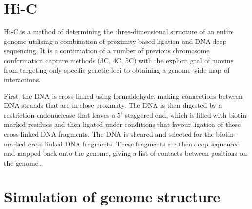 \documentclass[a4paper,11pt,oneside,final,english,toc=bib]{scrbook}
\begin{document}

\section{Hi-C} %
\label{sec:hi_c}

Hi-C is a method of determining the three-dimensional structure of an entire genome utilising a combination of proximity-based ligation and DNA deep sequencing. It is a continuation of a number of previous chromosome conformation capture methods (3C, 4C, 5C) with the explicit goal of moving from targeting only specific genetic loci to obtaining a genome-wide map of interactions.

First, the DNA is cross-linked using formaldehyde, making connections between DNA strands that are in close proximity. The DNA is then digested by a restriction endonuclease that leaves a 5' staggered end, which is filled with biotin-marked residues and then ligated under conditions that favour ligation of those cross-linked DNA fragments. The DNA is sheared and selected for the biotin-marked cross-linked DNA fragments. These fragments are then deep sequenced and mapped back onto the genome, giving a list of contacts between positions on the genome.\cite{lieberman-aiden_comprehensive_2009}.


\section{Simulation of genome structure} %
\label{sec:simulation_of_genome_structure}
\end{document}
